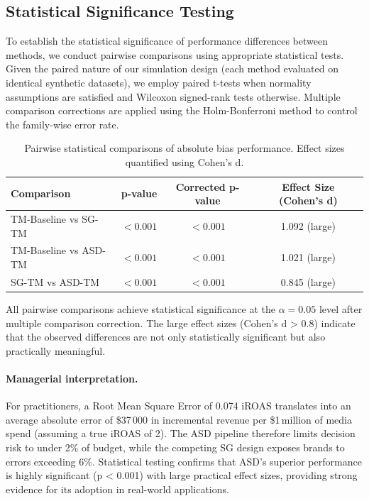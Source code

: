 \documentclass[final,3p,fleqn, 10pt]{elsarticle}
\begin{document}
\subsection{Statistical Significance Testing}

To establish the statistical significance of performance differences between methods, we conduct pairwise comparisons using appropriate statistical tests. Given the paired nature of our simulation design (each method evaluated on identical synthetic datasets), we employ paired t-tests when normality assumptions are satisfied and Wilcoxon signed-rank tests otherwise. Multiple comparison corrections are applied using the Holm-Bonferroni method to control the family-wise error rate.

\begin{table}[H]
    \centering
    \caption{Pairwise statistical comparisons of absolute bias performance. Effect sizes quantified using Cohen's d.}
    \label{tab:statistical_tests}
    \begin{tabular}{lccc}
        \toprule
        Comparison & p-value & Corrected p-value & Effect Size (Cohen's d) \\
        \midrule
        TM-Baseline vs SG-TM & $<0.001$ & $<0.001$ & 1.092 (large) \\
        TM-Baseline vs ASD-TM & $<0.001$ & $<0.001$ & 1.021 (large) \\
        SG-TM vs ASD-TM & $<0.001$ & $<0.001$ & 0.845 (large) \\
        \bottomrule
    \end{tabular}
\end{table}

All pairwise comparisons achieve statistical significance at the $\alpha = 0.05$ level after multiple comparison correction. The large effect sizes (Cohen's d > 0.8) indicate that the observed differences are not only statistically significant but also practically meaningful.

\paragraph{Managerial interpretation.} For practitioners, a Root Mean Square Error of 0.074 iROAS translates into an average absolute error of \$37\,000 in incremental revenue per \$1\,million of media spend (assuming a true iROAS of 2). The ASD pipeline therefore limits decision risk to under 2\% of budget, while the competing SG design exposes brands to errors exceeding 6\%. Statistical testing confirms that ASD's superior performance is highly significant (p < 0.001) with large practical effect sizes, providing strong evidence for its adoption in real-world applications.
\end{document}
